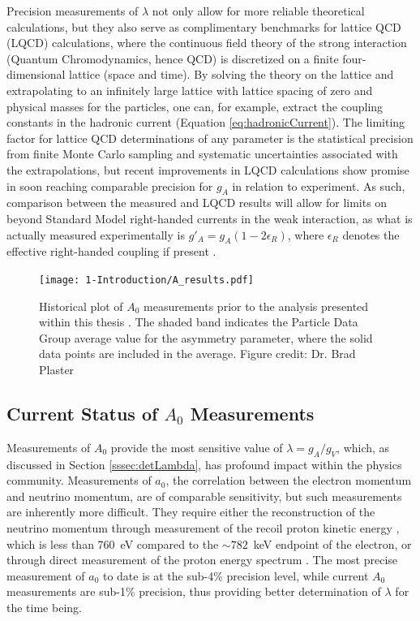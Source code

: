 Precision measurements of $\lambda$ not only allow for more reliable theoretical calculations, but
they also serve as complimentary benchmarks for lattice QCD (LQCD) calculations, where the continuous
field theory of the strong interaction (Quantum Chromodynamics, hence QCD)
is discretized on a finite four-dimensional lattice (space and time). By solving the theory on
the lattice and extrapolating to an infinitely large lattice with lattice spacing of zero 
and physical masses for the particles, one can, for example, extract the coupling constants in the
hadronic current (Equation \ref{eq:hadronicCurrent}). The limiting factor for lattice QCD
determinations of any parameter is the statistical precision from finite Monte Carlo sampling
and systematic uncertainties associated with the extrapolations, but recent improvements in
LQCD calculations \cite{bhattacharya2016,capitani2017iso,berkowitz2017accurate,chang2017nucleon}
show promise in soon reaching comparable precision for $g_A$ in relation to
experiment. As such, comparison between the measured and LQCD results will allow for limits on
beyond Standard Model right-handed currents in the weak interaction, as what is actually measured experimentally
is $g'_A = g_A(1-2\epsilon_R)$, where $\epsilon_R$ denotes the effective right-handed coupling if present
\cite{cirigliano2013beta,gonzalez2016global,alioli2017right}.

\begin{figure} [h]
  \centering
  \texttt{[image: 1-Introduction/A\_results.pdf]}
  \caption{Historical plot of $A_0$ measurements prior to the analysis presented within
    this thesis
    \cite{bopp1986,erozolimskii1991new,yerozolimsky1997,liaud1997,abele2002,mund2013,mendenhall2013}.
    The shaded band indicates the Particle Data Group average value \cite{pdg}
    for the asymmetry parameter, where the solid data points are included in the average. 
    Figure credit: Dr. Brad Plaster \cite{bradPlot}}
  \label{fig:Ameasurements}
\end{figure}


\subsection{Current Status of $A_0$ Measurements} \label{ssec:Previous_results}

Measurements of $A_0$ provide the most sensitive value of $\lambda = g_A/g_V$,
which, as discussed in Section \ref{sssec:detLambda}, has profound impact within the physics community.
Measurements of $a_0$, the correlation between the electron momentum and
neutrino momentum, are of comparable sensitivity, but such measurements are inherently more difficult.
They require either the reconstruction of the neutrino momentum through measurement of the recoil proton
kinetic energy \cite{darius2017measurement}, which is less than 760~eV compared to the $\sim782$~keV endpoint
of the electron, or through direct measurement of
the proton energy spectrum \cite{byrne2002determination}. The most precise measurement of $a_0$ to date
is at the sub-4\% precision level, while current $A_0$ measurements are sub-1\% precision, thus providing
better determination of $\lambda$ for the time being.

